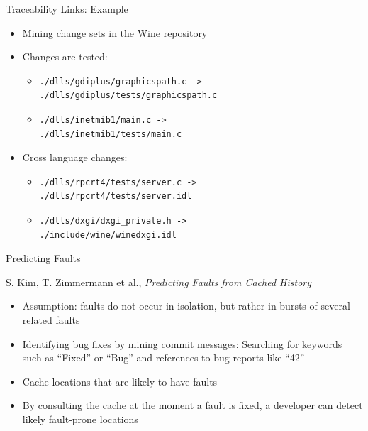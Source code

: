 \begin{frame}[containsverbatim]{Traceability Links: Example}
  \begin{itemize}
  \item Mining change sets in the Wine repository
  \item Changes are tested:
    \begin{itemize}
    \item 
\begin{verbatim}
./dlls/gdiplus/graphicspath.c ->
./dlls/gdiplus/tests/graphicspath.c
\end{verbatim}
    \item 
\begin{verbatim}
./dlls/inetmib1/main.c ->
./dlls/inetmib1/tests/main.c
\end{verbatim}
    \end{itemize}
  \item Cross language changes:
    \begin{itemize}
    \item
\begin{verbatim}
./dlls/rpcrt4/tests/server.c ->
./dlls/rpcrt4/tests/server.idl
\end{verbatim}
    \item
\begin{verbatim}
./dlls/dxgi/dxgi_private.h ->
./include/wine/winedxgi.idl
\end{verbatim}
    \end{itemize}
  \end{itemize}
\end{frame}


\begin{frame}{Predicting Faults}
  \begin{thebibliography}
    \beamertemplatearticlebibitems
    S. Kim, T. Zimmermann et al., {\em Predicting Faults from Cached
      History}
  \end{thebibliography}


  \begin{itemize}
  \item Assumption: faults do not occur in isolation, but rather in
    bursts of several related faults
  \item Identifying bug fixes by mining commit messages: Searching for
    keywords such as ``Fixed'' or ``Bug'' and references to bug
    reports like ``42''
  \item Cache locations that are likely to have faults
  \item By consulting the cache at the moment a fault is fixed, a
    developer can detect likely fault-prone locations
  \end{itemize}
\end{frame}


